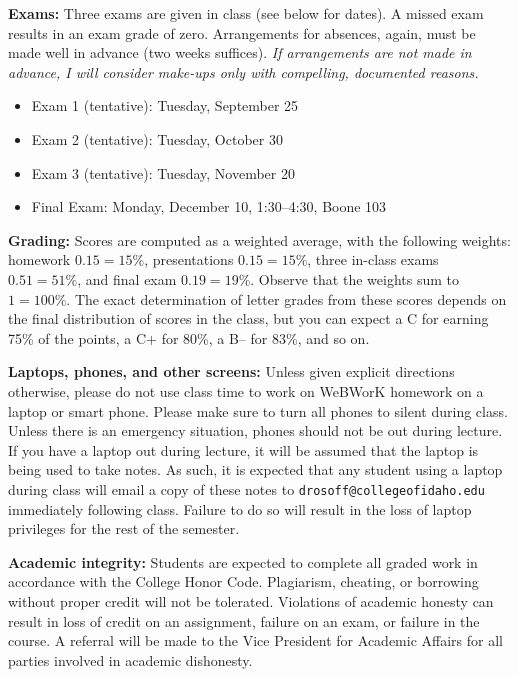 \documentclass[12pt,twoside]{amsart}
\begin{document}
\textbf{Exams:} Three exams are given in class (see below for dates). A missed exam results in an exam grade of zero. Arrangements for absences, again, must be made well in advance (two weeks suffices). \emph{If arrangements are not made in advance, I will consider make-ups only with compelling, documented reasons.}
\begin{itemize}
	\item Exam 1 (tentative): Tuesday, September 25
	\item Exam 2 (tentative): Tuesday, October 30
    \item Exam 3 (tentative): Tuesday, November 20
	\item Final Exam: Monday, December 10, 1:30--4:30, Boone 103
\end{itemize}

\textbf{Grading:} Scores are computed as a weighted average, with the following weights: homework $0.15 = 15\%$, presentations $0.15 = 15\%$, three in-class exams $0.51 = 51\%$, and final exam $0.19 = 19\%$. Observe that the weights sum to $1 = 100\%$. The exact determination of letter grades from these scores depends on the final distribution of scores in the class, but you can expect a C for earning 75\% of the points, a C+ for 80\%, a B-- for 83\%, and so on.

\textbf{Laptops, phones, and other screens:} Unless given explicit directions otherwise, please do not use class time to work on WeBWorK homework on a laptop or smart phone. Please make sure to turn all phones to silent during class. Unless there is an emergency situation, phones should not be out during lecture. If you have a laptop out during lecture, it will be assumed that the laptop is being used to take notes. As such, it is expected that any student using a laptop during class will email a copy of these notes to \verb]drosoff@collegeofidaho.edu] immediately following class. Failure to do so will result in the loss of laptop privileges for the rest of the semester.

\textbf{Academic integrity:} Students are expected to complete all graded work in accordance with the College Honor Code. Plagiarism, cheating, or borrowing without proper credit will not be tolerated.  Violations of academic honesty can result in loss of credit on an assignment, failure on an exam, or failure in the course. A referral will be made to the Vice President for Academic Affairs for all parties involved in academic dishonesty.
\end{document}

